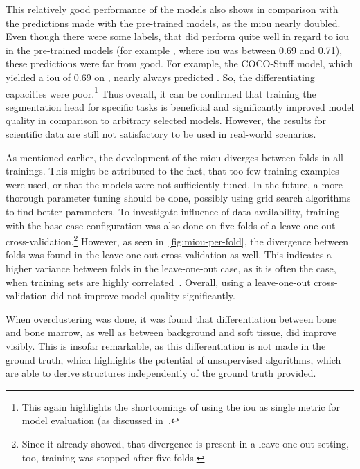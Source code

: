 This relatively good performance of the models also shows in comparison with the predictions made with the pre-trained models, as the \gls{miou} nearly doubled.
Even though there were some labels, that did perform quite well in regard to \gls{iou} in the pre-trained models (for example , where \gls{iou} was between 0.69 and 0.71), these predictions were far from good.
For example, the COCO-Stuff model, which yielded a \gls{iou} of 0.69 on , nearly always predicted .
So, the differentiating capacities were poor.\footnote{This again highlights the shortcomings of using the \gls{iou} as single metric for model evaluation (as discussed in~\autocite{Reinke2022}.}
Thus overall, it can be confirmed that training the segmentation head for specific tasks is beneficial and significantly improved model quality in comparison to arbitrary selected models.
However, the results for scientific data are still not satisfactory to be used in real-world scenarios.


As mentioned earlier, the development of the \gls{miou} diverges between folds in all trainings.
This might be attributed to the fact, that too few training examples were used, or that the models were not sufficiently tuned.
In the future, a more thorough parameter tuning should be done, possibly using grid search algorithms to find better parameters.
To investigate influence of data availability, training with the base case configuration was also done on five folds of a leave-one-out cross-validation.\footnote{Since it already showed, that divergence is present in a leave-one-out setting, too, training was stopped after five folds.}
However, as seen in~\autoref{fig:miou-per-fold}, the divergence between folds was found in the leave-one-out cross-validation as well.
This indicates a higher variance between folds in the leave-one-out case, as it is often the case, when training sets are highly correlated~\autocite{Bengio2004}.
Overall, using a leave-one-out cross-validation did not improve model quality significantly.

When overclustering was done, it was found that differentiation between bone and bone marrow, as well as between background and soft tissue, did improve visibly.
This is insofar remarkable, as this differentiation is not made in the ground truth, which highlights the potential of unsupervised algorithms, which are able to derive structures independently of the ground truth provided.

